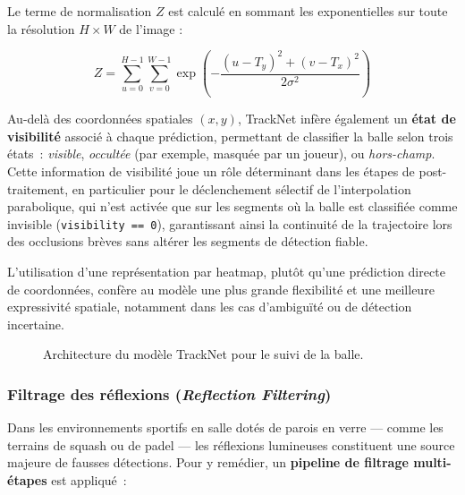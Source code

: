 Le terme de normalisation $Z$ est calculé en sommant les exponentielles sur toute la résolution $H \times W$ de l'image :

\begin{equation}
    Z = \sum_{u=0}^{H-1} \sum_{v=0}^{W-1} \exp \left( -\frac{(u - T_y)^2 + (v - T_x)^2}{2\sigma^2} \right)
\end{equation}


Au-delà des coordonnées spatiales $(x, y)$, TrackNet infère également
un \textbf{état de visibilité} associé à chaque prédiction, permettant
de classifier la balle selon trois états~: \textit{visible},
\textit{occultée} (par exemple, masquée par un joueur), ou
\textit{hors-champ}. Cette information de visibilité joue un rôle
déterminant dans les étapes de post-traitement, en particulier pour le
déclenchement sélectif de l'interpolation parabolique, qui n'est activée
que sur les segments où la balle est classifiée comme invisible
(\texttt{visibility == 0}), garantissant ainsi la continuité de la
trajectoire lors des occlusions brèves sans altérer les segments de
détection fiable.
 
L'utilisation d'une représentation par heatmap, plutôt qu'une prédiction
directe de coordonnées, confère au modèle une plus grande flexibilité et
une meilleure expressivité spatiale, notamment dans les cas d'ambiguïté
ou de détection incertaine.
\begin{figure}[H]
    \centering
    \caption{Architecture du modèle TrackNet pour le suivi de la balle.}
    \label{fig:tracknet_archi}
\end{figure}

 
\subsubsection{Filtrage des réflexions (\textit{Reflection Filtering})}
\label{subsubsec:reflection_filtering}
 
Dans les environnements sportifs en salle dotés de parois en verre ---
comme les terrains de squash ou de padel --- les réflexions lumineuses
constituent une source majeure de fausses détections. Pour y remédier,
un \textbf{pipeline de filtrage multi-étapes} est appliqué~:
 
